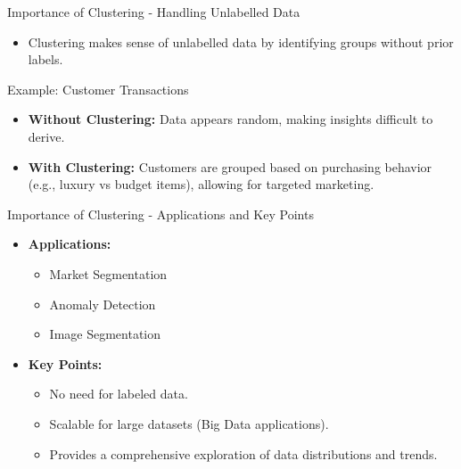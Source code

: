 \documentclass[aspectratio=169]{beamer}
\begin{document}
\begin{frame}[fragile]{Importance of Clustering - Handling Unlabelled Data}
    \begin{itemize}
        \item Clustering makes sense of unlabelled data by identifying groups without prior labels.
    \end{itemize}

    \begin{block}{Example: Customer Transactions}
        \begin{itemize}
            \item \textbf{Without Clustering:} Data appears random, making insights difficult to derive.
            \item \textbf{With Clustering:} Customers are grouped based on purchasing behavior (e.g., luxury vs budget items), allowing for targeted marketing.
        \end{itemize}
    \end{block}
\end{frame}

\begin{frame}[fragile]{Importance of Clustering - Applications and Key Points}
    \begin{itemize}
        \item \textbf{Applications:} 
        \begin{itemize}
            \item Market Segmentation
            \item Anomaly Detection
            \item Image Segmentation
        \end{itemize}
        
        \item \textbf{Key Points:}
        \begin{itemize}
            \item No need for labeled data.
            \item Scalable for large datasets (Big Data applications).
            \item Provides a comprehensive exploration of data distributions and trends.
        \end{itemize}
    \end{itemize}
\end{frame}
\end{document}
